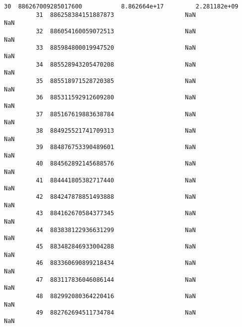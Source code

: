 \documentclass[11pt]{article}
\begin{document}
\begin{Verbatim}[commandchars=\\\{\}]
         30  886267009285017600           8.862664e+17         2.281182e+09   
         31  886258384151887873                    NaN                  NaN   
         32  886054160059072513                    NaN                  NaN   
         33  885984800019947520                    NaN                  NaN   
         34  885528943205470208                    NaN                  NaN   
         35  885518971528720385                    NaN                  NaN   
         36  885311592912609280                    NaN                  NaN   
         37  885167619883638784                    NaN                  NaN   
         38  884925521741709313                    NaN                  NaN   
         39  884876753390489601                    NaN                  NaN   
         40  884562892145688576                    NaN                  NaN   
         41  884441805382717440                    NaN                  NaN   
         42  884247878851493888                    NaN                  NaN   
         43  884162670584377345                    NaN                  NaN   
         44  883838122936631299                    NaN                  NaN   
         45  883482846933004288                    NaN                  NaN   
         46  883360690899218434                    NaN                  NaN   
         47  883117836046086144                    NaN                  NaN   
         48  882992080364220416                    NaN                  NaN   
         49  882762694511734784                    NaN                  NaN   
         

\end{Verbatim}
\end{document}
